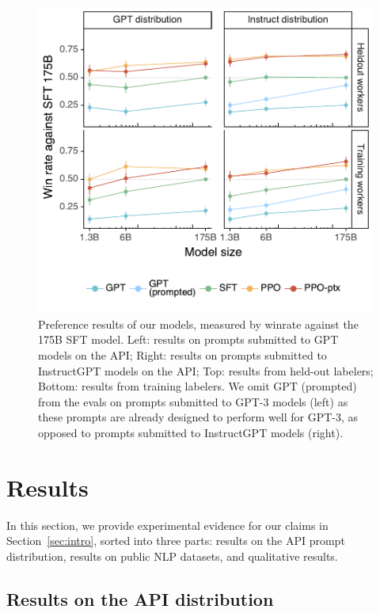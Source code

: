 \documentclass{article}
\begin{document}
\begin{figure}
    \centering
    \includegraphics[width=0.9\linewidth]{figs/pref-facetted.pdf}
    \caption{Preference results of our models, measured by winrate against the 175B SFT model.  Left: results on prompts submitted to GPT models on the API; Right: results on prompts submitted to InstructGPT models on the API; Top: results from held-out labelers; Bottom: results from training labelers. We omit GPT (prompted) from the evals on prompts submitted to GPT-3 models (left) as these prompts are already designed to perform well for GPT-3, as opposed to prompts submitted to InstructGPT models (right).}
    \label{fig:pref_main_detailed}
\end{figure}


\section{Results}
\label{sec:results}

In this section, we provide experimental evidence for our claims in Section~\ref{sec:intro}, sorted into three parts: results on the API prompt distribution, results on public NLP datasets, and qualitative results.

\subsection{Results on the API distribution}
\label{sec:results-api}
\end{document}
